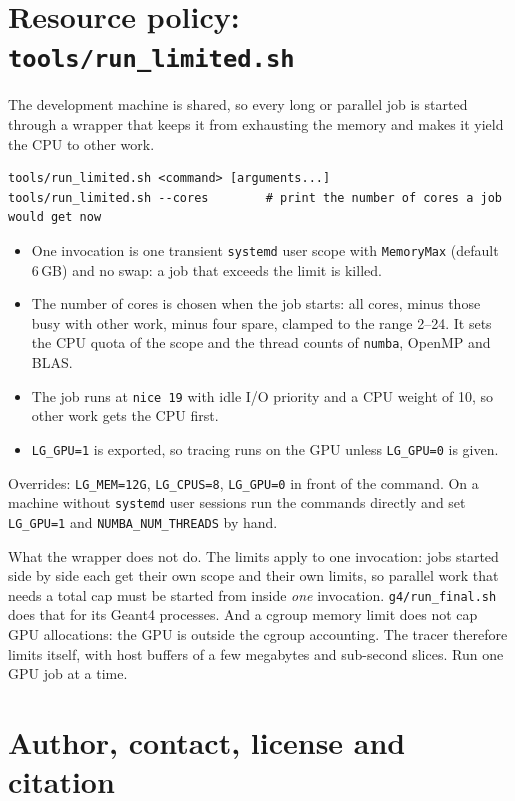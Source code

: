 \documentclass[11pt,a4paper]{article}
\newcommand{\code}[1]{\texttt{#1}}
\begin{document}
\section{Resource policy: \texttt{tools/run\_limited.sh}}
\label{sec:resources}

The development machine is shared, so every long or parallel job is started through a wrapper that
keeps it from exhausting the memory and makes it yield the CPU to other work.
\begin{lstlisting}
tools/run_limited.sh <command> [arguments...]
tools/run_limited.sh --cores        # print the number of cores a job would get now
\end{lstlisting}
\begin{itemize}
\item One invocation is one transient \code{systemd} user scope with \code{MemoryMax} (default
6\,GB) and no swap: a job that exceeds the limit is killed.
\item The number of cores is chosen when the job starts: all cores, minus those busy with other work,
minus four spare, clamped to the range 2--24. It sets the CPU quota of the scope and the thread
counts of \code{numba}, OpenMP and BLAS.
\item The job runs at \code{nice 19} with idle I/O priority and a CPU weight of 10, so other work
gets the CPU first.
\item \code{LG\_GPU=1} is exported, so tracing runs on the GPU unless \code{LG\_GPU=0} is given.
\end{itemize}
Overrides: \code{LG\_MEM=12G}, \code{LG\_CPUS=8}, \code{LG\_GPU=0} in front of the command. On a
machine without \code{systemd} user sessions run the commands directly and set \code{LG\_GPU=1} and
\code{NUMBA\_NUM\_THREADS} by hand.

What the wrapper does not do. The limits apply to one invocation: jobs started side by side each get
their own scope and their own limits, so parallel work that needs a total cap must be started from
inside \emph{one} invocation. \code{g4/run\_final.sh} does that for its Geant4 processes. And a
cgroup memory limit does not cap GPU allocations: the GPU is outside the cgroup accounting. The
tracer therefore limits itself, with host buffers of a few megabytes and sub-second slices. Run one
GPU job at a time.

\section{Author, contact, license and citation}
\end{document}
